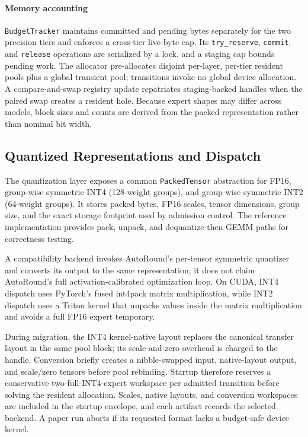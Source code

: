 \paragraph{Memory accounting}
\texttt{BudgetTracker} maintains committed and pending bytes separately for the two precision tiers and enforces a cross-tier live-byte cap. Its \texttt{try\_reserve}, \texttt{commit}, and \texttt{release} operations are serialized by a lock, and a staging cap bounds pending work. The allocator pre-allocates disjoint per-layer, per-tier resident pools plus a global transient pool; transitions invoke no global device allocation. A compare-and-swap registry update repatriates staging-backed handles when the paired swap creates a resident hole. Because expert shapes may differ across models, block sizes and counts are derived from the packed representation rather than nominal bit width.

\subsection{Quantized Representations and Dispatch}

The quantization layer exposes a common \texttt{PackedTensor} abstraction for FP16, group-wise symmetric INT4 (128-weight groups), and group-wise symmetric INT2 (64-weight groups). It stores packed bytes, FP16 scales, tensor dimensions, group size, and the exact storage footprint used by admission control. The reference implementation provides pack, unpack, and dequantize-then-GEMM paths for correctness testing.

A compatibility backend invokes AutoRound's per-tensor symmetric quantizer and converts its output to the same representation; it does not claim AutoRound's full activation-calibrated optimization loop. On CUDA, INT4 dispatch uses PyTorch's fused int4pack matrix multiplication, while INT2 dispatch uses a Triton kernel that unpacks values inside the matrix multiplication and avoids a full FP16 expert temporary.

During migration, the INT4 kernel-native layout replaces the canonical transfer layout in the same pool block; its scale-and-zero overhead is charged to the handle. Conversion briefly creates a nibble-swapped input, native-layout output, and scale/zero tensors before pool rebinding. Startup therefore reserves a conservative two-full-INT4-expert workspace per admitted transition before solving the resident allocation. Scales, native layouts, and conversion workspaces are included in the startup envelope, and each artifact records the selected backend. A paper run aborts if its requested format lacks a budget-safe device kernel.

